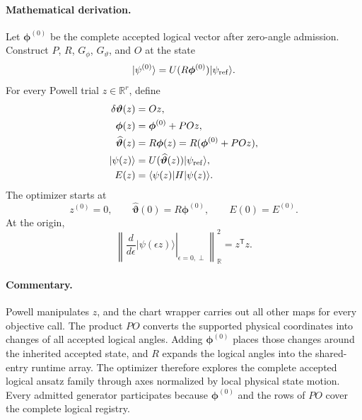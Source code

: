\documentclass[10pt,twocolumn]{article}
\newcommand{\ket}[1]{\lvert #1\rangle}
\newcommand{\bra}[1]{\langle #1\rvert}
\newcommand{\R}{\mathbb R}
\newcommand{\mathderiv}{\paragraph{Mathematical derivation.}}
\newcommand{\commentaryblock}{\paragraph{Commentary.}}
\begin{document}
\mathderiv Let \(\bm\phi^{(0)}\) be the complete accepted logical vector after
zero-angle admission. Construct \(P\), \(R\), \(G_\phi\), \(G_\vartheta\), and
\(O\) at the state
\begin{equation}
\ket{\psi^{(0)}}=U(R\bm\phi^{(0)})\ket{\psi_{\rm ref}}.
\label{eq:powell-origin}
\end{equation}
For every Powell trial \(z\in\R^r\), define
\begin{align}
\delta\bm\vartheta(z)&=Oz,\nonumber\\
\bm\phi(z)&=\bm\phi^{(0)}+POz,\nonumber\\
\widehat{\bm\vartheta}(z)&=R\bm\phi(z)
=R(\bm\phi^{(0)}+POz),\nonumber\\
\ket{\psi(z)}&=U(\widehat{\bm\vartheta}(z))
\ket{\psi_{\rm ref}},\nonumber\\
E(z)&=\bra{\psi(z)}H\ket{\psi(z)}.
\label{eq:powell-objective-chain}
\end{align}
The optimizer starts at
\begin{equation}
z^{(0)}=0,\qquad
\widehat{\bm\vartheta}(0)=R\bm\phi^{(0)},\qquad
E(0)=E^{(0)}.
\label{eq:powell-zero}
\end{equation}
At the origin,
\begin{equation}
\left\|\left.\frac{d}{d\epsilon}
\ket{\psi(\epsilon z)}\right|_{\epsilon=0,\perp}\right\|_{\R}^2
=z^{\mathsf T}z.
\label{eq:powell-origin-length}
\end{equation}

\begin{center}
\end{center}

\commentaryblock Powell manipulates \(z\), and the chart wrapper carries out
all other maps for every objective call. The product \(PO\) converts the
supported physical coordinates into changes of all accepted logical angles.
Adding \(\bm\phi^{(0)}\) places those changes around the inherited accepted
state, and \(R\) expands the logical angles into the shared-entry runtime
array. The optimizer therefore explores the complete accepted logical ansatz
family through axes normalized by local physical state motion. Every admitted
generator participates because \(\bm\phi^{(0)}\) and the rows of \(PO\)
cover the complete logical registry.
\end{document}
